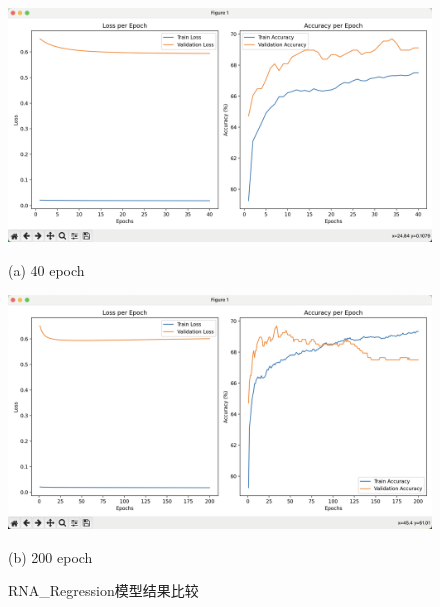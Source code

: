 \documentclass[a4paper,11pt,AutoFakeBold]{ctexart}
\begin{document}
\begin{figure}[h]
    \centering
    \begin{minipage}{0.49\linewidth}
        \centering
        \includegraphics[height=0.55\linewidth]{Figures/1-40.png}
        \caption*{(a) 40 epoch}
    \end{minipage}
    \begin{minipage}{0.49\linewidth}
        \centering
        \includegraphics[height=0.55\linewidth]{Figures/1-200.png}
        \caption*{(b) 200 epoch}
    \end{minipage}
    \caption{RNA\_Regression模型结果比较}
    \label{fig:RNA-Regression Compare}
\end{figure}
\end{document}
